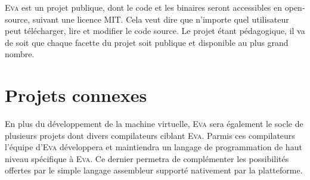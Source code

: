 \documentclass[11pt,twoside,french]{article}
\newcommand{\noun}[1]{\textsc{#1}}
\begin{document}
\noun{Eva} est un projet publique, dont le code et les binaires seront
accessibles en open-source, suivant une licence MIT. Cela veut dire
que n'importe quel utilisateur peut télécharger, lire et modifier
le code source. Le projet étant pédagogique, il va de soit que chaque
facette du projet soit publique et disponible au plus grand nombre.

\section{Projets connexes}

En plus du développement de la machine virtuelle, \noun{Eva} sera
également le socle de plusieurs projets dont divers compilateurs ciblant
\noun{Eva}. Parmis ces compilateurs l'équipe d'\noun{Eva} développera et maintiendra
un langage de programmation de haut niveau spécifique à \noun{Eva}. Ce dernier
permetra de complémenter les possibilités offertes par le simple langage
assembleur supporté nativement par la platteforme.
\end{document}
